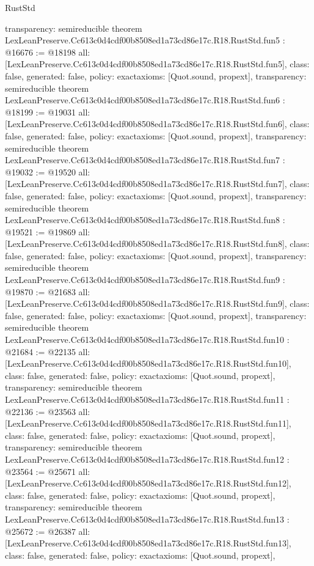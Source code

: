 \begin{lexlean}{RustStd}
\begin{coremodule}
{  transparency: semireducible
}
theorem LexLeanPreserve.Cc613c0d4cdf00b8508ed1a73cd86e17c.R18.RustStd.fun5 : @16676 := @18198 {
  all: [LexLeanPreserve.Cc613c0d4cdf00b8508ed1a73cd86e17c.R18.RustStd.fun5],
  class: false,
  generated: false,
  policy: exact{axioms: [Quot.sound, propext]},
  transparency: semireducible
}
theorem LexLeanPreserve.Cc613c0d4cdf00b8508ed1a73cd86e17c.R18.RustStd.fun6 : @18199 := @19031 {
  all: [LexLeanPreserve.Cc613c0d4cdf00b8508ed1a73cd86e17c.R18.RustStd.fun6],
  class: false,
  generated: false,
  policy: exact{axioms: [Quot.sound, propext]},
  transparency: semireducible
}
theorem LexLeanPreserve.Cc613c0d4cdf00b8508ed1a73cd86e17c.R18.RustStd.fun7 : @19032 := @19520 {
  all: [LexLeanPreserve.Cc613c0d4cdf00b8508ed1a73cd86e17c.R18.RustStd.fun7],
  class: false,
  generated: false,
  policy: exact{axioms: [Quot.sound, propext]},
  transparency: semireducible
}
theorem LexLeanPreserve.Cc613c0d4cdf00b8508ed1a73cd86e17c.R18.RustStd.fun8 : @19521 := @19869 {
  all: [LexLeanPreserve.Cc613c0d4cdf00b8508ed1a73cd86e17c.R18.RustStd.fun8],
  class: false,
  generated: false,
  policy: exact{axioms: [Quot.sound, propext]},
  transparency: semireducible
}
theorem LexLeanPreserve.Cc613c0d4cdf00b8508ed1a73cd86e17c.R18.RustStd.fun9 : @19870 := @21683 {
  all: [LexLeanPreserve.Cc613c0d4cdf00b8508ed1a73cd86e17c.R18.RustStd.fun9],
  class: false,
  generated: false,
  policy: exact{axioms: [Quot.sound, propext]},
  transparency: semireducible
}
theorem LexLeanPreserve.Cc613c0d4cdf00b8508ed1a73cd86e17c.R18.RustStd.fun10 : @21684 := @22135 {
  all: [LexLeanPreserve.Cc613c0d4cdf00b8508ed1a73cd86e17c.R18.RustStd.fun10],
  class: false,
  generated: false,
  policy: exact{axioms: [Quot.sound, propext]},
  transparency: semireducible
}
theorem LexLeanPreserve.Cc613c0d4cdf00b8508ed1a73cd86e17c.R18.RustStd.fun11 : @22136 := @23563 {
  all: [LexLeanPreserve.Cc613c0d4cdf00b8508ed1a73cd86e17c.R18.RustStd.fun11],
  class: false,
  generated: false,
  policy: exact{axioms: [Quot.sound, propext]},
  transparency: semireducible
}
theorem LexLeanPreserve.Cc613c0d4cdf00b8508ed1a73cd86e17c.R18.RustStd.fun12 : @23564 := @25671 {
  all: [LexLeanPreserve.Cc613c0d4cdf00b8508ed1a73cd86e17c.R18.RustStd.fun12],
  class: false,
  generated: false,
  policy: exact{axioms: [Quot.sound, propext]},
  transparency: semireducible
}
theorem LexLeanPreserve.Cc613c0d4cdf00b8508ed1a73cd86e17c.R18.RustStd.fun13 : @25672 := @26387 {
  all: [LexLeanPreserve.Cc613c0d4cdf00b8508ed1a73cd86e17c.R18.RustStd.fun13],
  class: false,
  generated: false,
  policy: exact{axioms: [Quot.sound, propext]},
}
\end{coremodule}
\end{lexlean}
